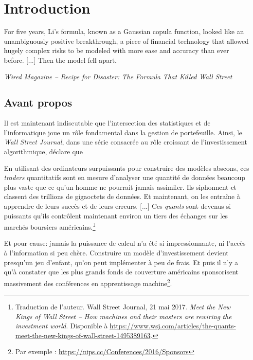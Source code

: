 \section{Introduction}
\label{sec:intro}

\epigraph{For five years, Li's formula, known as a Gaussian copula function, looked like
  an unambiguously positive breakthrough, a piece of financial technology that allowed
  hugely complex risks to be modeled with more ease and accuracy than ever before. [...]
  Then the model fell apart.}{\textit{Wired Magazine -- Recipe for Disaster: The Formula
    That Killed Wall Street}}


\subsection{Avant propos}

Il est maintenant indiscutable que l'intersection des statistiques et de l'informatique
joue un rôle fondamental dans la gestion de portefeuille. Ainsi, le \textsl{Wall Street
  Journal}, dans une série consacrée au rôle croissant de l'investissement algorithmique,
déclare que
\begin{displayquote}
  En utilisant des ordinateurs surpuissants pour construire des modèles abscons, ces
  \textit{traders} quantitatifs sont en mesure d'analyser une quantité de données beaucoup
  plus vaste que ce qu'un homme ne pourrait jamais assimiler. Ils siphonnent et classent
  des trillions de gigaoctets de données. Et maintenant, on les entraîne à apprendre de
  leurs succès et de leurs erreurs. [...] Ces \textit{quants} sont devenus si puissants
  qu'ils contrôlent maintenant environ un tiers des échanges sur les marchés boursiers
  américains.\footnote{Traduction de l'auteur. Wall Street Journal, 21 mai
    2017. \textit{Meet the New Kings of Wall Street -- How machines and their masters are
      rewiring the investment world}. Disponible à {\scriptsize
      \url{https://www.wsj.com/articles/the-quants-meet-the-new-kings-of-wall-street-1495389163}}.}
\end{displayquote}
Et pour cause: jamais la puissance de calcul n'a été si impressionnante, ni l'accès à
l'information si peu chère. Construire un modèle d'investissement devient presqu'un jeu
d'enfant, qu'on peut implémenter à peu de frais. Et puis il n'y a qu'à constater que les
plus grands fonds de couverture américains sponsorisent massivement des conférences en
apprentissage machine\footnote{Par exemple : {\scriptsize
    \url{https://nips.cc/Conferences/2016/Sponsors}}}.

